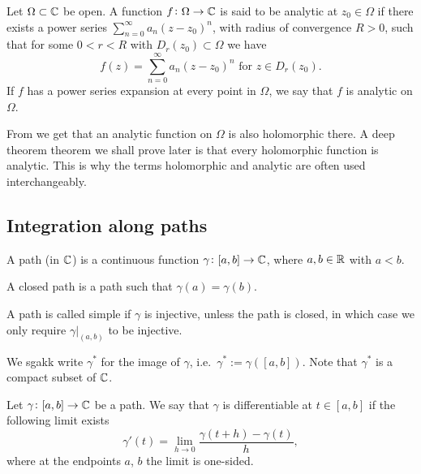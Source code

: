 \documentclass[11pt,a4paper]{article}
\newcommand{\powerseries}{\sum_{n=0}^{\infty} a_n (z - z_0)^n}
\begin{document}
\begin{definition}
  Let $\Omega \subset \mathbb{C}$ be open.
  A function $f \colon \Omega \to \mathbb{C}$ is said to be analytic at
  $z_0 \in \Omega$ if there exists a power series $\powerseries$,
  with radius of convergence $R > 0$, such that for some $0 < r < R$
  with $D_r(z_0) \subset \Omega$ we have
  \[
    f(z) = \powerseries \text{ for } z \in D_r(z_0).
  \]
  If $f$ has a power series expansion at every point in $\Omega$,
  we say that $f$ is analytic on $\Omega$.
\end{definition}

\begin{remark}
  From  we get that an analytic function on $\Omega$
  is also holomorphic there. 
  A deep theorem theorem we shall prove later is that every holomorphic 
  function is analytic.
  This is why the terms holomorphic and analytic are often used interchangeably.
\end{remark}

\subsection{Integration along paths}
\begin{definition}[Path]
  A path (in $\mathbb{C}$) is a continuous function $\gamma \colon [a,b] \to \mathbb{C}$,
  where $a,b \in \mathbb{R}$ with $a < b$.
\end{definition}
\begin{definition}
  A closed path is a path such that $\gamma(a) = \gamma(b)$.
\end{definition}
\begin{definition}
  A path is called simple if $\gamma$ is injective, unless the path is closed,
  in which case we only require $\gamma\vert_{(a,b)}$ to be injective.
\end{definition}
\begin{remark}
  We sgakk write $\gamma^*$ for the image of $\gamma$, i.e.\
  $\gamma^* := \gamma([a,b])$.
  Note that $\gamma^*$ is a compact subset of $\mathbb{C}$.
\end{remark}

\begin{definition}
  Let $\gamma \colon [a, b] \to \mathbb{C}$ be a path.
  We say that $\gamma$ is differentiable at $t \in [a, b]$
  if the following limit exists
  \[
    \gamma'(t) = \lim_{h \to 0} \frac{\gamma(t + h) - \gamma(t)}{h},
  \]
  where at the endpoints $a$, $b$ the limit is one-sided.
\end{definition}
\end{document}
